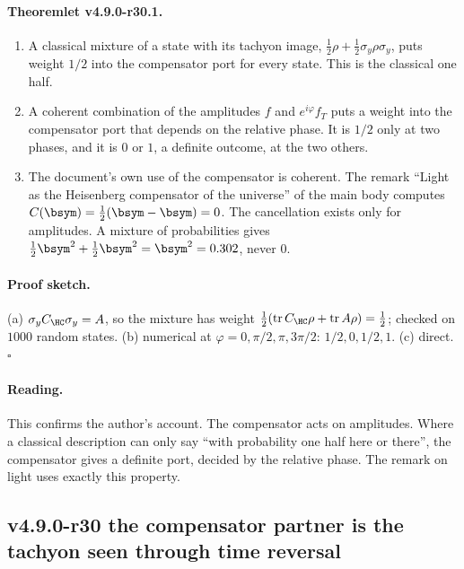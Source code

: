 \paragraph{Theoremlet v4.9.0-r30.1.}
\begin{enumerate}[leftmargin=2em]
\item[(a)] A classical mixture of a state with its tachyon image, \(\tfrac12\rho+\tfrac12\sigma_y\rho\sigma_y\), puts weight \(1/2\) into the
compensator port for every state.  This is the classical one half.
\item[(b)] A coherent combination of the amplitudes \(f\) and \(e^{i\varphi}f_T\) puts a weight into the compensator port that depends on the
relative phase.  It is \(1/2\) only at two phases, and it is \(0\) or \(1\), a definite outcome, at the two others.
\item[(c)] The document's own use of the compensator is coherent.  The remark ``Light as the Heisenberg compensator of the universe''
of the main body computes \(C(\bsym)=\tfrac12(\bsym-\bsym)=0\).  The cancellation exists only for amplitudes.  A mixture of
probabilities gives \(\tfrac12\bsym^2+\tfrac12\bsym^2=\bsym^2=0.302\), never \(0\).
\end{enumerate}

\paragraph{Proof sketch.}
(a) \(\sigma_yC_{\HC}\sigma_y=A\), so the mixture has weight \(\tfrac12(\operatorname{tr}C_{\HC}\rho+\operatorname{tr}A\rho)=\tfrac12\); checked on \(1000\)
random states.  (b) numerical at \(\varphi=0,\pi/2,\pi,3\pi/2\): \(1/2,0,1/2,1\).  (c) direct.  \(\square\)

\paragraph{Reading.}
This confirms the author's account.  The compensator acts on amplitudes.  Where a classical description can only say ``with
probability one half here or there'', the compensator gives a definite port, decided by the relative phase.  The remark on light
uses exactly this property.

\subsection*{v4.9.0-r30 the compensator partner is the tachyon seen through time reversal}
\label{subsec:v490-r30-partner}

